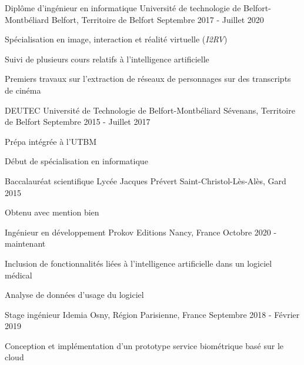 \documentclass[12pt, a4paper]{awesome-cv}
\begin{document}
\begin{cventries}
  \cventry
  {Diplôme d'ingénieur en informatique}
  {Université de technologie de Belfort-Montbéliard}
  {Belfort, Territoire de Belfort}
  {Septembre 2017 - Juillet 2020}
  {
    \begin{cvitems}
      \item Spécialisation en image, interaction et réalité virtuelle (\textit{I2RV})
      \item Suivi de plusieurs cours relatifs à l'intelligence artificielle
      \item Premiers travaux sur l'extraction de réseaux de personnages sur des transcripts de cinéma
    \end{cvitems}
  }

  \cventry
  {DEUTEC}
  {Université de Technologie de Belfort-Montbéliard}
  {Sévenans, Territoire de Belfort}
  {Septembre 2015 - Juillet 2017}
  {
    \begin{cvitems}
      \item Prépa intégrée à l'UTBM
      \item Début de spécialisation en informatique
    \end{cvitems}
  }

  \cventry
  {Baccalauréat scientifique}
  {Lycée Jacques Prévert}
  {Saint-Christol-Lès-Alès, Gard}
  {2015}
  {
    \begin{cvitems}
      \item Obtenu avec mention bien
    \end{cvitems}
  }

  
\end{cventries}



\begin{cventries}

  \cventry
  {Ingénieur en développement}
  {Prokov Editions}
  {Nancy, France}
  {Octobre 2020 - maintenant}
  {
    \begin{cvitems}
      \item Inclusion de fonctionnalités liées à l'intelligence artificielle dans un logiciel médical
      \item Analyse de données d'usage du logiciel
    \end{cvitems}
  }

  \cventry
  {Stage ingénieur}
  {Idemia}
  {Osny, Région Parisienne, France}
  {Septembre 2018 - Février 2019}
  {
    \begin{cvitems}
      \item Conception et implémentation d'un prototype service biométrique basé sur le cloud
    \end{cvitems}
  }

\end{cventries}


\nocite{*}
\printbibliography[title=Publications]
\end{document}
